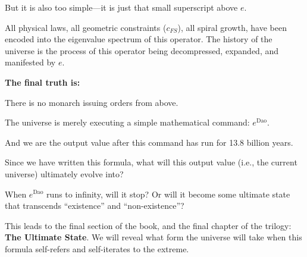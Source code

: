 But it is also too simple---it is just that small superscript above $e$.

All physical laws, all geometric constraints ($c_{FS}$), all spiral growth, have been encoded into the eigenvalue spectrum of this operator. The history of the universe is the process of this operator being decompressed, expanded, and manifested by $e$.

\textbf{The final truth is:}

There is no monarch issuing orders from above.

The universe is merely executing a simple mathematical command: \textbf{$e^{\text{Dao}}$}.

And we are the output value after this command has run for 13.8 billion years.

Since we have written this formula, what will this output value (i.e., the current universe) ultimately evolve into?

When $e^{\text{Dao}}$ runs to infinity, will it stop? Or will it become some ultimate state that transcends ``existence'' and ``non-existence''?

This leads to the final section of the book, and the final chapter of the trilogy: \textbf{The Ultimate State}. We will reveal what form the universe will take when this formula self-refers and self-iterates to the extreme.

